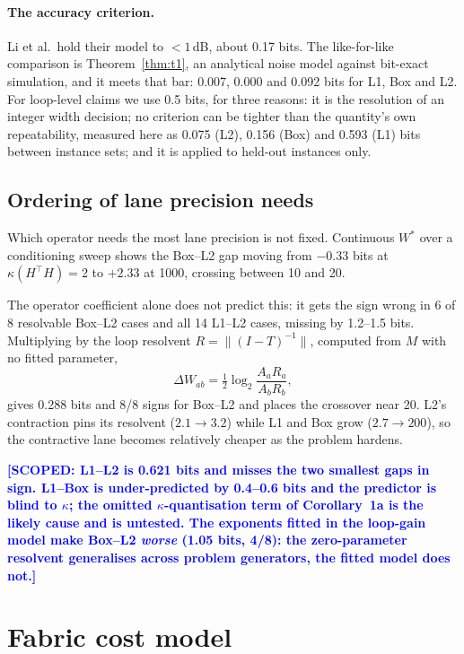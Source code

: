 \documentclass[11pt,a4paper]{article}
\newcommand{\scoped}[1]{\textcolor{blue}{\textbf{[SCOPED: #1]}}}
\begin{document}
\paragraph{The accuracy criterion.} Li et al.\ hold their model to $<1$\,dB,
about 0.17 bits. The like-for-like comparison is Theorem~\ref{thm:t1}, an
analytical noise model against bit-exact simulation, and it meets that bar:
0.007, 0.000 and 0.092 bits for L1, Box and L2. For loop-level claims we use
0.5 bits, for three reasons: it is the resolution of an integer width decision;
no criterion can be tighter than the quantity's own repeatability, measured here
as 0.075 (L2), 0.156 (Box) and 0.593 (L1) bits between instance sets; and it is
applied to held-out instances only.

\subsection{Ordering of lane precision needs}

Which operator needs the most lane precision is not fixed. Continuous $W^*$
over a conditioning sweep shows the Box--L2 gap moving from $-0.33$ bits at
$\kappa(H^{\top}H)=2$ to $+2.33$ at 1000, crossing between 10 and 20.

The operator coefficient alone does not predict this: it gets the sign wrong in
6 of 8 resolvable Box--L2 cases and all 14 L1--L2 cases, missing by 1.2--1.5
bits. Multiplying by the loop resolvent $R=\lVert (I-T)^{-1}\rVert$, computed
from $M$ with no fitted parameter,
\begin{equation}
\Delta W_{ab} = \tfrac12\log_2\frac{A_a R_a}{A_b R_b},
\end{equation}
gives 0.288 bits and 8/8 signs for Box--L2 and places the crossover near 20.
L2's contraction pins its resolvent ($2.1\to3.2$) while L1 and Box grow
($2.7\to200$), so the contractive lane becomes relatively cheaper as the problem
hardens.

\scoped{L1--L2 is 0.621 bits and misses the two smallest gaps in sign. L1--Box
is under-predicted by 0.4--0.6 bits and the predictor is blind to $\kappa$; the
omitted $\kappa$-quantisation term of Corollary~1a is the likely cause and is
untested. The exponents fitted in the loop-gain model make Box--L2 \emph{worse}
(1.05 bits, 4/8): the zero-parameter resolvent generalises across problem
generators, the fitted model does not.}

\section{Fabric cost model}
\end{document}
